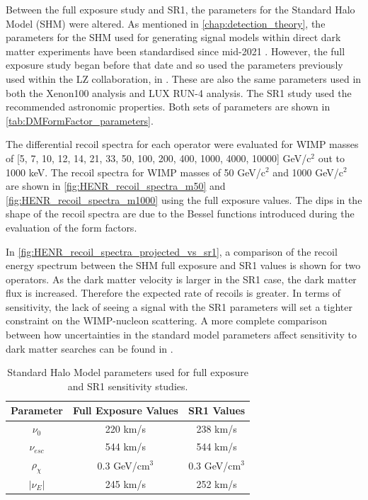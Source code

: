 \par
Between the full exposure study and SR1, the parameters for the Standard Halo Model (SHM) were altered.
As mentioned in \autoref{chap:detection_theory}, the parameters for the SHM used for generating signal models within direct dark matter experiments have been standardised since mid-2021 \cite{standard_halo_model_conventions_ref}.
However, the full exposure study began before that date and so used the parameters previously used within the LZ collaboration, in \cite{LZ_projected_sensitivity_paper_ref,LZ_TechnicalDesignReview_ref,LZ_Ibles_LZStats_Thesis_ref}.
These are also the same parameters used in both the Xenon100 analysis and LUX RUN-4 analysis.
The SR1 study used the recommended astronomic properties.
Both sets of parameters are shown in \autoref{tab:DMFormFactor_parameters}.

\par
The differential recoil spectra for each operator were evaluated for WIMP masses of [5, 7, 10, 12, 14, 21, 33, 50, 100, 200, 400, 1000, 4000, 10000] GeV/c$^{2}$ out to 1000 keV.
The recoil spectra for WIMP masses of 50 GeV/c$^2$ and 1000 GeV/c$^2$ are shown in \autoref{fig:HENR_recoil_spectra_m50} and \autoref{fig:HENR_recoil_spectra_m1000} using the full exposure values.
The dips in the shape of the recoil spectra are due to the Bessel functions introduced during the evaluation of the form factors.

\par
In \autoref{fig:HENR_recoil_spectra_projected_vs_sr1}, a comparison of the recoil energy spectrum between the SHM full exposure and SR1 values is shown for two operators.
As the dark matter velocity is larger in the SR1 case, the dark matter flux is increased.
Therefore the expected rate of recoils is greater.
In terms of sensitivity, the lack of seeing a signal with the SR1 parameters will set a tighter constraint on the WIMP-nucleon scattering.
A more complete comparison between how uncertainties in the standard model parameters affect sensitivity to dark matter searches can be found in \cite{LZ_Ibles_LZStats_Thesis_ref,billyboxer_thesis_ref}.

\begin{table}[]
    \centering
    \begin{tabular}{c|c|c}
        Parameter         & Full Exposure Values   & SR1 Values       \\ \hline
        $\nu_0$           & 220 km/s           & 238 km/s         \\ 
        $\nu_{esc}$       & 544 km/s           & 544 km/s         \\
        $\rho_{\chi}$     & 0.3 GeV/cm$^{3}$   & 0.3 GeV/cm$^{3}$ \\
        $|\nu_E|$         & 245 km/s           & 252 km/s  
    \end{tabular}
    \caption{Standard Halo Model parameters used for full exposure and SR1 sensitivity studies.}
    \label{tab:DMFormFactor_parameters}
\end{table}


